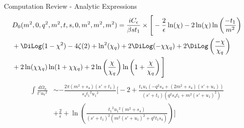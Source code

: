 \begin{frame}[<+->]{Computation Review - Analytic Expressions}
\begin{align*}
\nonumber
&D_0(m^2,0,q^2,m^2,t,s,0,m^2,m^2,m^2) = \frac{i C_\epsilon}{\beta s t_1}\times \Bigg[ -\frac{2}{\epsilon} \ln(\chi) -2\ln(\chi)\ln\left(\frac{-t_1}{m^2}\right)\\
\nonumber
&+\DiLog(1-\chi^2)-4\zeta(2)+\ln^2(\chi_q) + 2\DiLog(-\chi\chi_q)+2\DiLog\left(\frac{-\chi}{\chi_q}\right)\\
&+2\ln(\chi\chi_q) \ln(1+\chi\chi_q)+2\ln\left(\frac{\chi}{\chi_q}\right)\ln\left(1+\frac{\chi}{\chi_q}\right) \Bigg]
\end{align*}
\begin{align*}
\nonumber
\int\!\! \frac{d\Omega_n}{t' {u_7}^2} &\sim -\frac{2 \pi  (m^2+s_4) ({s'}+{t_1}) }{s_4 {t_1}^2 {u_1}^2} \Bigg[-2+\frac{{t_1} {u_1} (-q^2 s_4+(2 m^2+s_4) ({s'}+{u_1}))}{({s'}+{t_1}) \left(q^2 s_4 {t_1}+m^2 ({s'}+{u_1})^2\right)}\nonumber\\
 & +\frac{2}{\epsilon }+\ln\left(\frac{{t_1}^2 {u_1}^2 ({m^2}+{s_4})}{({s'}+{t_1})^2 \left({m^2} ({s'}+{u_1})^2+{q^2} {t_1} {s_4}\right)}\right)\Bigg]
\end{align*}\pause
{}
\end{frame}
